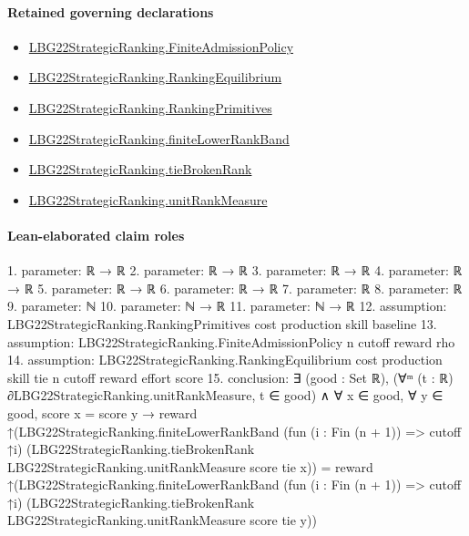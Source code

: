 \documentclass[10pt]{article}
\begin{document}
\paragraph{Retained governing declarations}
\begin{itemize}\raggedright
\item \hyperlink{paper-prerequisite-d056dd7c8060653c}{LBG22\allowbreak{}Strategic\allowbreak{}Ranking.\allowbreak{}Finite\allowbreak{}Admission\allowbreak{}Policy}
\item \hyperlink{paper-prerequisite-2a1b692f4e3136c6}{LBG22\allowbreak{}Strategic\allowbreak{}Ranking.\allowbreak{}Ranking\allowbreak{}Equilibrium}
\item \hyperlink{paper-prerequisite-9bbcc12f4a1736bf}{LBG22\allowbreak{}Strategic\allowbreak{}Ranking.\allowbreak{}Ranking\allowbreak{}Primitives}
\item \hyperlink{paper-prerequisite-a42f440ddc254fa7}{LBG22\allowbreak{}Strategic\allowbreak{}Ranking.\allowbreak{}finite\allowbreak{}Lower\allowbreak{}Rank\allowbreak{}Band}
\item \hyperlink{paper-prerequisite-b7c71e53177b76c6}{LBG22\allowbreak{}Strategic\allowbreak{}Ranking.\allowbreak{}tie\allowbreak{}Broken\allowbreak{}Rank}
\item \hyperlink{governing-declaration-678cf48d549cb620}{LBG22\allowbreak{}Strategic\allowbreak{}Ranking.\allowbreak{}unit\allowbreak{}Rank\allowbreak{}Measure}
\end{itemize}
\paragraph{Lean-elaborated claim roles}\begin{ReviewVerbatim}
1. parameter: ℝ → ℝ
2. parameter: ℝ → ℝ
3. parameter: ℝ → ℝ
4. parameter: ℝ → ℝ
5. parameter: ℝ → ℝ
6. parameter: ℝ → ℝ
7. parameter: ℝ
8. parameter: ℝ
9. parameter: ℕ
10. parameter: ℕ → ℝ
11. parameter: ℕ → ℝ
12. assumption: LBG22StrategicRanking.RankingPrimitives cost production skill baseline
13. assumption: LBG22StrategicRanking.FiniteAdmissionPolicy n cutoff reward rho
14. assumption: LBG22StrategicRanking.RankingEquilibrium cost production skill tie n cutoff reward effort score
15. conclusion: ∃ (good : Set ℝ),
  (∀ᵐ (t : ℝ) ∂LBG22StrategicRanking.unitRankMeasure, t ∈ good) ∧
    ∀ x ∈ good,
      ∀ y ∈ good,
        score x = score y →
          reward
              ↑(LBG22StrategicRanking.finiteLowerRankBand (fun (i : Fin (n + 1)) => cutoff ↑i)
                  (LBG22StrategicRanking.tieBrokenRank LBG22StrategicRanking.unitRankMeasure score tie x)) =
            reward
              ↑(LBG22StrategicRanking.finiteLowerRankBand (fun (i : Fin (n + 1)) => cutoff ↑i)
                  (LBG22StrategicRanking.tieBrokenRank LBG22StrategicRanking.unitRankMeasure score tie y))
\end{ReviewVerbatim}
\end{document}
